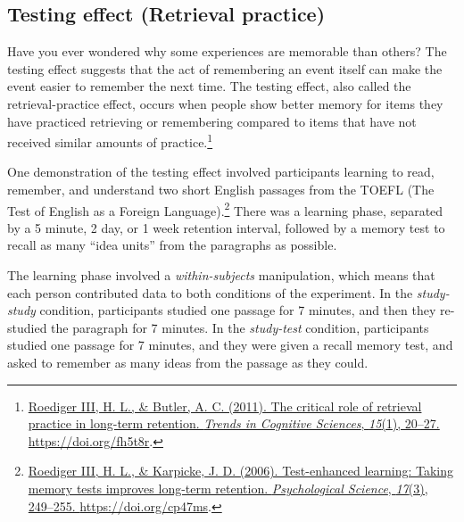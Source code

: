 \documentclass[
  oneside,
  12pt]{crumpbook}
\begin{document}
\hypertarget{testing-effect-retrieval-practice}{%
\subsection{Testing effect (Retrieval practice)}\label{testing-effect-retrieval-practice}}

Have you ever wondered why some experiences are memorable than others? The testing effect suggests that the act of remembering an event itself can make the event easier to remember the next time. The testing effect, also called the retrieval-practice effect, occurs when people show better memory for items they have practiced retrieving or remembering compared to items that have not received similar amounts of practice.\footnote{\protect\hyperlink{ref-roedigeriiiCriticalRoleRetrieval2011}{Roediger III, H. L., \& Butler, A. C. (2011). The critical role of retrieval practice in long-term retention. \emph{Trends in Cognitive Sciences}, \emph{15}(1), 20--27. \url{https://doi.org/fh5t8r}}.}

One demonstration of the testing effect involved participants learning to read, remember, and understand two short English passages from the TOEFL (The Test of English as a Foreign Language).\footnote{\protect\hyperlink{ref-roedigeriiiTestenhancedLearningTaking2006}{Roediger III, H. L., \& Karpicke, J. D. (2006). Test-enhanced learning: {Taking} memory tests improves long-term retention. \emph{Psychological Science}, \emph{17}(3), 249--255. \url{https://doi.org/cp47ms}}.} There was a learning phase, separated by a 5 minute, 2 day, or 1 week retention interval, followed by a memory test to recall as many ``idea units'' from the paragraphs as possible.

The learning phase involved a \emph{within-subjects} manipulation, which means that each person contributed data to both conditions of the experiment. In the \emph{study-study} condition, participants studied one passage for 7 minutes, and then they re-studied the paragraph for 7 minutes. In the \emph{study-test} condition, participants studied one passage for 7 minutes, and they were given a recall memory test, and asked to remember as many ideas from the passage as they could.
\end{document}
